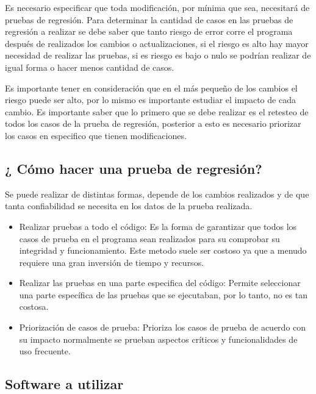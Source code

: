 \documentclass[conference]{IEEEtran}
\begin{document}
Es necesario especificar que toda modificación, por mínima que sea, necesitará de pruebas de regresión. 
Para determinar la cantidad de casos en las pruebas de regresión a realizar se debe saber que tanto riesgo de error corre el programa después de realizados los cambios o actualizaciones, si el riesgo es alto hay mayor necesidad de realizar las pruebas, si es riesgo es bajo o nulo se podrían realizar de igual forma o hacer menos cantidad de casos.

Es importante tener en consideración que en el más pequeño de los cambios el riesgo puede ser alto, por lo mismo es importante estudiar el impacto de cada cambio. Es importante saber que lo primero que se debe realizar es el retesteo de todos los casos de la prueba de regresión, posterior a esto es necesario priorizar los casos en especifico que tienen modificaciones.


\subsection{¿ Cómo hacer una prueba de regresión?}

Se puede realizar de distintas formas, depende de los cambios realizados y de que tanta confiabilidad se necesita en los datos de la prueba realizada.

\begin{itemize}

\item Realizar pruebas a todo el código: Es la forma de garantizar que todos los casos de prueba en el programa sean realizados para su comprobar su integridad y funcionamiento. Este metodo suele ser costoso ya que a menudo requiere una gran inversión de tiempo y recursos.


\item Realizar las pruebas en una parte especifica del código:   
Permite seleccionar una parte específica de las pruebas que se ejecutaban, por lo tanto, no es tan costosa.

\item Priorización de casos de prueba: Prioriza los casos de prueba de acuerdo con su impacto normalmente se prueban aspectos críticos y funcionalidades de uso frecuente.

\end{itemize}


\subsection{Software a utilizar}
\end{document}
